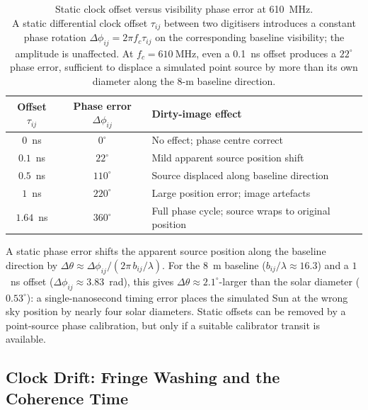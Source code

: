 \begin{table}[H]
  \centering
  \caption[Static clock offset versus visibility phase error at 610~MHz]{Static clock offset versus visibility phase error at 610~MHz.\\[4pt]
  A static differential clock offset $\tau_{ij}$ between two digitisers
  introduces a constant phase rotation $\Delta\phi_{ij}=2\pi f_c\tau_{ij}$
  on the corresponding baseline visibility; the amplitude is unaffected.
  At $f_c=\SI{610}{\mega\hertz}$, even a 0.1~ns offset produces a $22^\circ$
  phase error, sufficient to displace a simulated point source by more than
  its own diameter along the 8-m baseline direction.}
  \label{tab:clock-static}
  \renewcommand{\arraystretch}{1.25}
  \begin{tabularx}{\textwidth}{c c >{\raggedright\arraybackslash}X}
    \toprule
    \textbf{Offset $\tau_{ij}$} & \textbf{Phase error $\Delta\phi_{ij}$}
      & \textbf{Dirty-image effect} \\
    \midrule
    $0$~ns    & $0^\circ$    & No effect; phase centre correct \\
    $0.1$~ns  & $22^\circ$   & Mild apparent source position shift \\
    $0.5$~ns  & $110^\circ$  & Source displaced along baseline direction \\
    $1$~ns    & $220^\circ$  & Large position error; image artefacts \\
    $1.64$~ns & $360^\circ$  & Full phase cycle; source wraps to original position \\
    \bottomrule
  \end{tabularx}
\end{table}

A static phase error shifts the apparent source position along the baseline
direction by $\Delta\theta\approx\Delta\phi_{ij}/(2\pi\,b_{ij}/\lambda)$. For the
\SI{8}{\metre} baseline ($b_{ij}/\lambda\approx16.3$) and a $1$~ns offset
($\Delta\phi_{ij}\approx3.83$~rad), this gives $\Delta\theta\approx2.1^\circ$-larger
than the solar diameter ($0.53^\circ$): a single-nanosecond timing error places the
simulated Sun at the wrong sky position by nearly four solar diameters. Static offsets
can be removed by a point-source phase calibration, but only if a suitable calibrator
transit is available.

\subsection{Clock Drift: Fringe Washing and the Coherence Time}

